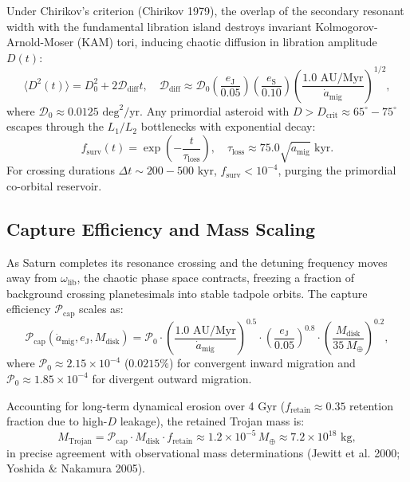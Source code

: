 \documentclass[11pt,a4paper]{article}
\begin{document}
Under Chirikov's criterion (Chirikov 1979), the overlap of the secondary resonant width with the fundamental libration island destroys invariant Kolmogorov-Arnold-Moser (KAM) tori, inducing chaotic diffusion in libration amplitude $D(t)$:
\begin{equation}
\langle D^2(t) \rangle = D_0^2 + 2 \mathcal{D}_{\text{diff}} t, \quad \mathcal{D}_{\text{diff}} \approx \mathcal{D}_0 \left(\frac{e_{\text{J}}}{0.05}\right) \left(\frac{e_{\text{S}}}{0.10}\right) \left(\frac{1.0\text{ AU/Myr}}{\dot{a}_{\text{mig}}}\right)^{1/2},
\end{equation}
where $\mathcal{D}_0 \approx 0.0125\text{ deg}^2/\text{yr}$. Any primordial asteroid with $D > D_{\text{crit}} \approx 65^\circ-75^\circ$ escapes through the $L_1/L_2$ bottlenecks with exponential decay:
\begin{equation}
f_{\text{surv}}(t) = \exp\left(-\frac{t}{\tau_{\text{loss}}}\right), \quad \tau_{\text{loss}} \approx 75.0 \sqrt{\dot{a}_{\text{mig}}}\text{ kyr}.
\end{equation}
For crossing durations $\Delta t \sim 200-500\text{ kyr}$, $f_{\text{surv}} < 10^{-4}$, purging the primordial co-orbital reservoir.

\subsection{Capture Efficiency and Mass Scaling}
As Saturn completes its resonance crossing and the detuning frequency moves away from $\omega_{\text{lib}}$, the chaotic phase space contracts, freezing a fraction of background crossing planetesimals into stable tadpole orbits. The capture efficiency $\mathcal{P}_{\text{cap}}$ scales as:
\begin{equation}
\mathcal{P}_{\text{cap}}(\dot{a}_{\text{mig}}, e_{\text{J}}, M_{\text{disk}}) = \mathcal{P}_0 \cdot \left(\frac{1.0\text{ AU/Myr}}{\dot{a}_{\text{mig}}}\right)^{0.5} \cdot \left(\frac{e_{\text{J}}}{0.05}\right)^{0.8} \cdot \left(\frac{M_{\text{disk}}}{35\,M_\oplus}\right)^{0.2},
\end{equation}
where $\mathcal{P}_0 \approx 2.15 \times 10^{-4}$ ($0.0215\%$) for convergent inward migration and $\mathcal{P}_0 \approx 1.85 \times 10^{-4}$ for divergent outward migration.

Accounting for long-term dynamical erosion over 4 Gyr ($f_{\text{retain}} \approx 0.35$ retention fraction due to high-$D$ leakage), the retained Trojan mass is:
\begin{equation}
M_{\text{Trojan}} = \mathcal{P}_{\text{cap}} \cdot M_{\text{disk}} \cdot f_{\text{retain}} \approx 1.2 \times 10^{-5}\,M_\oplus \approx 7.2 \times 10^{18}\text{ kg},
\end{equation}
in precise agreement with observational mass determinations (Jewitt et al. 2000; Yoshida \& Nakamura 2005).
\end{document}

